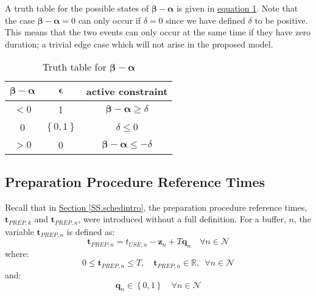 A truth table for the possible states of 
$\boldsymbol{\beta} - \boldsymbol{\alpha}$ is given in
\hyperref[tbl.truthalphabeta]{equation \ref*{tbl.truthalphabeta}}.
Note that the case $\boldsymbol{\beta} - \boldsymbol{\alpha} = 0$ can only
occur if $\delta = 0$ since we have defined $\delta$ to be positive.
This means that the two events can only occur at the same time if they have
zero duration; a trivial edge case which will not arise in the proposed model.
\begin{table}[h!]
    \centering
    \caption{Truth table for $\boldsymbol{\beta} - \boldsymbol{\alpha}$}
    \label{tbl.truthalphabeta}
    \begin{tabular}{c c | c}
        $\boldsymbol{\beta} - \boldsymbol{\alpha}$ & $\boldsymbol{\epsilon}$ &
        active constraint\\ \hline
        $< 0$ & 1 & $\boldsymbol{\beta} - \boldsymbol{\alpha} \ge \delta$\\
        0 & $\left\{ 0,1 \right\}$ & $\delta \le 0$\\
        $> 0$ & 0 & $\boldsymbol{\beta} - \boldsymbol{\alpha} \le -\delta$\\
    \end{tabular}
\end{table}

\subsection{Preparation Procedure Reference Times}\label{SS.prepreftimes}
Recall that in \hyperref[SS.schedintro]{Section \ref*{SS.schedintro}},
the preparation procedure reference times, 
$\boldsymbol{t}_{\mathit{PREP},k}$ and $\boldsymbol{t}_{\mathit{PREP},n}$, were
introduced without a full definition.
For a buffer, $n$, the variable $\boldsymbol{t}_{\mathit{PREP},n}$ is defined
as:
\begin{equation}
    \boldsymbol{t}_{\mathit{PREP},n} = t_{\mathit{USE},n} - \boldsymbol{z}_{n}
    + T \boldsymbol{q}_{n} \quad \forall n \in \mathcal{N}
    \label{eq.tprep}
\end{equation}
where:
\begin{equation}
    0 \le \boldsymbol{t}_{\mathit{PREP},n} \le T, \quad 
    \boldsymbol{t}_{\mathit{PREP},n} \in \mathbb{R}, \enspace \forall n \in 
    \mathcal{N}
    \label{eq.tprep1}
\end{equation}
and:
\begin{equation}
    \boldsymbol{q}_{n} \in \left\{0, 1\right\} \quad \forall n \in \mathcal{N}
    \label{eq.q}
\end{equation}

